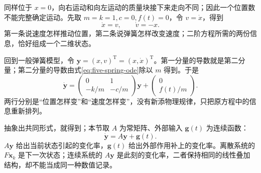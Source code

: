 \documentclass[a4paper,12pt,twoside,openany,fontset=none]{ctexbook}
\numberwithin{equation}{chapter}
\begin{document}
同样位于 $x=0$，向右运动和向左运动的质量块接下来走向不同；因此一个位置数不能完整确定运动。先取 $m=k=1,c=0,f(t)=0$，令 $v=\dot x$，得到
\begin{equation}
 \dot x=v,\qquad \dot v=-x.
\end{equation}
第一条说速度怎样推动位置，第二条说弹簧怎样改变速度；二阶方程所需的两份信息，恰好组成一个二维状态。

回到一般弹簧模型，令 $\boldsymbol y=(x,v)^{\mathrm T}=(x,\dot x)^{\mathrm T}$。第一分量的导数就是第二分量；第二分量的导数由式\eqref{eq:five-spring-ode}除以 $m$ 得到。于是
\begin{equation}
 \dot{\boldsymbol y}
 =\begin{pmatrix}0&1\\-k/m&-c/m\end{pmatrix}\boldsymbol y
 +\begin{pmatrix}0\\f(t)/m\end{pmatrix}.
\end{equation}
两行分别是“位置怎样变”和“速度怎样变”，没有新添物理规律，只把原方程中的信息重新排列。


抽象出共同形式，就得到；本节取 $A$ 为常矩阵、外部输入 $\boldsymbol g(t)$ 为连续函数：
\begin{equation}
 \dot{\boldsymbol y}=A\boldsymbol y+\boldsymbol g(t).
 \label{eq:five-continuous-general}
\end{equation}
$A\boldsymbol y$ 给出当前状态引起的变化率，$\boldsymbol g(t)$ 给出外部作用补上的变化率。离散系统的 $F\boldsymbol x_k$ 是下一次状态；连续系统的 $A\boldsymbol y$ 是此刻的变化率，二者保持相同的线性叠加结构，却不能当成同一种数值记录。
\end{document}
